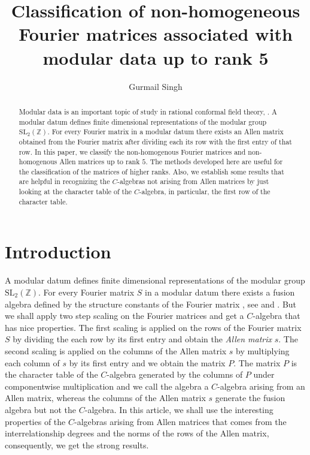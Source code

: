 \documentclass[12pt]{amsart}
\begin{document}
\title[Non-homogeneous Fourier matrices]{Classification of non-homogeneous Fourier matrices associated with modular data up to rank 5}

\author[G. Singh]{Gurmail Singh}
\address{Department of Mathematics and Statistics, University of Regina, Regina, Canada, S4S 0A2}

\date{}



\begin{abstract}
Modular data is an important topic of study in rational conformal field theory, \cite{TG}. A modular datum defines finite dimensional representations of the modular group $\mbox{SL}_2({{\mathbb Z}})$. For every Fourier matrix in a modular datum there exists an Allen matrix obtained from the Fourier matrix after dividing each its row with the first entry of that row. In this paper, we classify the non-homogenous Fourier matrices and non-homogenous Allen matrices up to rank $5$. The methods developed here are useful for the classification of the matrices of higher ranks. Also, we establish some results that are helpful in recognizing the $C$-algebras not arising from Allen matrices by just looking at the character table of the $C$-algebra, in particular, the first row of the character table.
\end{abstract}

\maketitle

\section{Introduction}

\medskip
A modular datum defines finite dimensional representations of the modular group $\mbox{SL}_2({{\mathbb Z}})$. For every Fourier matrix $S$ in a modular datum there exists a fusion algebra defined by the structure constants of the Fourier matrix
, see \cite{MC1} and \cite{TG}. But we shall apply two step scaling on the Fourier matrices and get a $C$-algebra that has nice properties. The first scaling is applied on the rows of the Fourier matrix $S$ by dividing the each row by its first entry and obtain the \emph{Allen matrix} $s$. The second scaling is applied on the columns of the Allen matrix $s$ by multiplying  each column of $s$ by its first entry and we obtain the matrix $P$. The matrix $P$ is the character table of the $C$-algebra generated by the columns of $P$ under componentwise multiplication and we call the algebra a $C$-algebra arising from an Allen matrix, whereas the columns of the Allen matrix $s$ generate the fusion algebra but not the $C$-algebra. In this article, we shall use the interesting properties of the $C$-algebras arising from Allen matrices that comes from the interrelationship degrees and the norms of the rows of the Allen matrix, consequently, we get the strong results.
\end{document}
